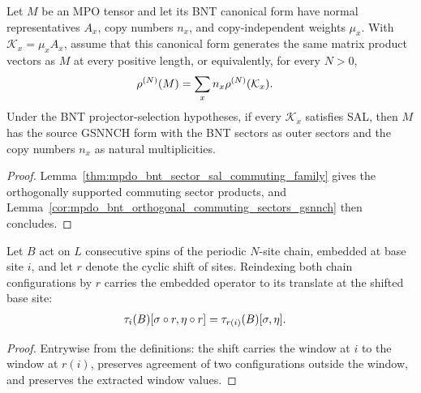 \begin{corollary}
    \label{cor:mpdo_bnt_sector_sal_gsnnch}
    \leanok
    Let $M$ be an MPO tensor and let its BNT canonical form have normal
    representatives $A_x$, copy numbers $n_x$, and copy-independent weights
    $\mu_x$. With $\mathcal K_x=\mu_xA_x$, assume that this canonical form
    generates the same matrix product vectors as $M$ at every positive length,
    or equivalently, for every $N>0$,
    \begin{align}
        \rho^{(N)}(M)
         & =\sum_x n_x\rho^{(N)}(\mathcal K_x).
        \notag
    \end{align}
    Under the BNT projector-selection hypotheses, if every $\mathcal K_x$
    satisfies SAL, then $M$ has the source GSNNCH form with the BNT sectors as
    outer sectors and the copy numbers $n_x$ as natural multiplicities.
\end{corollary}

\begin{proof}\leanok
    Lemma~\ref{thm:mpdo_bnt_sector_sal_commuting_family} gives the
    orthogonally supported commuting sector products, and
    Lemma~\ref{cor:mpdo_bnt_orthogonal_commuting_sectors_gsnnch} then
    concludes.
\end{proof}

\begin{lemma}
    \label{lem:mpdo_gsnnch_shift_transport}
    \leanok
    Let $B$ act on $L$ consecutive spins of the periodic $N$-site chain,
    embedded at base site $i$, and let $r$ denote the cyclic shift of
    sites. Reindexing both chain configurations by $r$ carries the embedded
    operator to its translate at the shifted base site:
    \begin{align}
        \tau_i(B)[\sigma\circ r, \eta\circ r]
         & =\tau_{r(i)}(B)[\sigma,\eta].
        \notag
    \end{align}
\end{lemma}

\begin{proof}\leanok
    Entrywise from the definitions: the shift carries the window at $i$ to
    the window at $r(i)$, preserves agreement of two configurations outside
    the window, and preserves the extracted window values.
\end{proof}

